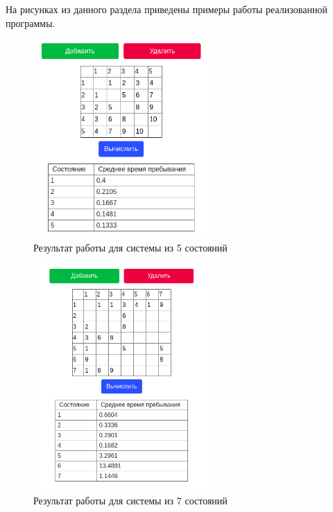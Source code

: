 На рисунках из данного раздела приведены примеры работы реализованной программы.

\begin{figure}[H]
    \centering
    \includegraphics[width=0.6\textwidth]{images/scr01.png}
    \caption{Результат работы для системы из 5 состояний}
    \label{fig:1}
\end{figure}
\begin{figure}[H]
    \centering
    \includegraphics[width=0.6\textwidth]{images/scr02.png}
    \caption{Результат работы для системы из 7 состояний}
    \label{fig:2}
\end{figure}
